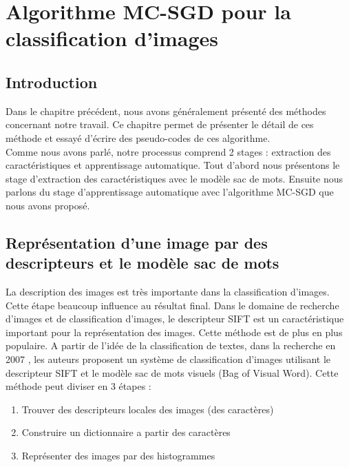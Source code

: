 \chapter{Algorithme MC-SGD pour la classification d'images}
\label{chap:impl}

\section{Introduction}
Dans le chapitre précédent, nous avons généralement présenté des méthodes concernant notre travail. Ce chapitre permet de présenter le détail de ces méthode et essayé d'écrire des pseudo-codes de ces algorithme.\\

Comme nous avons parlé, notre processus comprend 2 stages : extraction des caractéristiques et apprentissage automatique. Tout d'abord nous présentons le stage d'extraction des caractéristiques avec le modèle sac de mots. Ensuite nous parlons du stage d'apprentissage automatique avec l'algorithme MC-SGD que nous avons proposé.

\section{Représentation d'une image par des descripteurs et le modèle sac de mots}
La description des images est très importante dans la classification d'images. Cette étape beaucoup influence au résultat final. Dans le domaine de recherche d'images et de classification d'images, le descripteur SIFT \cite{low04} est un caractéristique important pour la représentation des images. Cette méthode est de plus en plus populaire. A partir de l'idée de la classification de textes, dans la recherche en 2007 \cite{bos07}, les auteurs proposent un système de classification d'images utilisant le descripteur SIFT et le modèle sac de mots visuels (Bag of Visual Word). Cette méthode peut diviser en 3 étapes :
\begin{enumerate}
\item Trouver des descripteurs locales des images (des caractères)
\item Construire un dictionnaire a partir des caractères
\item Représenter des images par des histogrammes
\end{enumerate}

